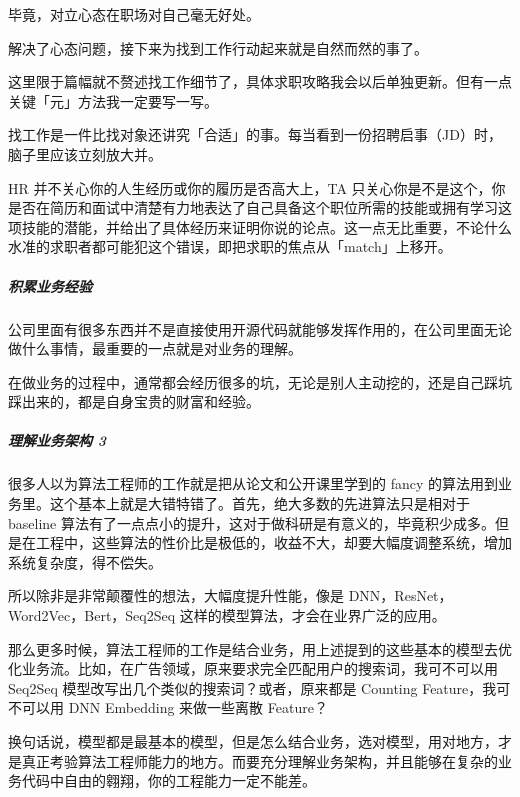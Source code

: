 \documentclass[letterpaper,10pt,english]{sphinxmanual}
\begin{document}
毕竟，对立心态在职场对自己毫无好处。

解决了心态问题，接下来为找到工作行动起来就是自然而然的事了。

这里限于篇幅就不赘述找工作细节了，具体求职攻略我会以后单独更新。但有一点关键「元」方法我一定要写一写。

找工作是一件比找对象还讲究「合适」的事。每当看到一份招聘启事（JD）时，脑子里应该立刻放大并。

HR 并不关心你的人生经历或你的履历是否高大上，TA
只关心你是不是这个，你是否在简历和面试中清楚有力地表达了自己具备这个职位所需的技能或拥有学习这项技能的潜能，并给出了具体经历来证明你说的论点。这一点无比重要，不论什么水准的求职者都可能犯这个错误，即把求职的焦点从「match」上移开。


\subparagraph{积累业务经验}
\label{\detokenize{chapter_interview/xintai:id7}}
公司里面有很多东西并不是直接使用开源代码就能够发挥作用的，在公司里面无论做什么事情，最重要的一点就是对业务的理解。

在做业务的过程中，通常都会经历很多的坑，无论是别人主动挖的，还是自己踩坑踩出来的，都是自身宝贵的财富和经验。


\subparagraph{理解业务架构 3\sphinxfootnotemark[829]}
\label{\detokenize{chapter_interview/xintai:id8}}%
\begin{footnotetext}[829]\sphinxAtStartFootnote
{}
%
\end{footnotetext}\ignorespaces 
很多人以为算法工程师的工作就是把从论文和公开课里学到的 fancy
的算法用到业务里。这个基本上就是大错特错了。首先，绝大多数的先进算法只是相对于
baseline
算法有了一点点小的提升，这对于做科研是有意义的，毕竟积少成多。但是在工程中，这些算法的性价比是极低的，收益不大，却要大幅度调整系统，增加系统复杂度，得不偿失。

所以除非是非常颠覆性的想法，大幅度提升性能，像是
DNN，ResNet，Word2Vec，Bert，Seq2Seq
这样的模型算法，才会在业界广泛的应用。

那么更多时候，算法工程师的工作是结合业务，用上述提到的这些基本的模型去优化业务流。比如，在广告领域，原来要求完全匹配用户的搜索词，我可不可以用
Seq2Seq 模型改写出几个类似的搜索词？或者，原来都是 Counting
Feature，我可不可以用 DNN Embedding 来做一些离散 Feature？

换句话说，模型都是最基本的模型，但是怎么结合业务，选对模型，用对地方，才是真正考验算法工程师能力的地方。而要充分理解业务架构，并且能够在复杂的业务代码中自由的翱翔，你的工程能力一定不能差。
\end{document}
